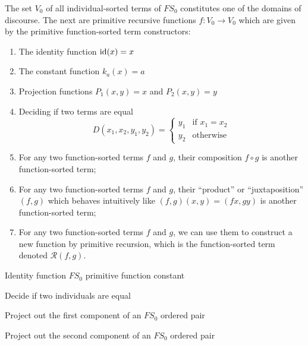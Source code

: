 \begin{node}
The set $V_{0}$ of all individual-sorted terms of $FS_{0}$ constitutes
one of the domains of discourse. The next are primitive recursive functions $f\colon V_{0}\to V_{0}$
which are given by the primitive function-sorted term constructors:
\begin{enumerate}
\item The identity function $\operatorname{id}(x)=x$
\item The constant function $k_{a}(x)=a$
\item Projection functions $P_{1}(x,y)=x$ and $P_{2}(x,y)=y$
\item Deciding if two terms are equal
  \begin{equation*}
D(x_{1},x_{2},y_{1},y_{2})=\begin{cases}y_{1} & \mbox{if }x_{1}=x_{2}\\
y_{2} & \mbox{otherwise}
\end{cases}
\end{equation*}
\item For any two function-sorted terms $f$ and $g$, their composition
  $f\circ g$ is another function-sorted term;
\item For any two function-sorted terms $f$ and $g$, their ``product''
  or ``juxtaposition'' $(f,g)$ which behaves intuitively like
  $(f,g)(x,y)=(fx,gy)$ is another function-sorted term;
\item For any two function-sorted terms $f$ and $g$, we can use them
  to construct a new function by primitive recursion, which is the
  function-sorted term denoted $\mathcal{R}(f,g)$.
\end{enumerate}
\end{node}

\nwenddocs{}\endmoddef\nwstartdeflinemarkup{}\nwenddeflinemarkup
\LA{}Identity function $FS_{0}$ primitive function constant~{\nwtagstyle{}}\RA{}

\LA{}Decide if two individuals are equal~{\nwtagstyle{}}\RA{}

\LA{}Project out the first component of an $FS_{0}$ ordered pair~{\nwtagstyle{}}\RA{}

\LA{}Project out the second component of an $FS_{0}$ ordered pair~{\nwtagstyle{}}\RA{}

